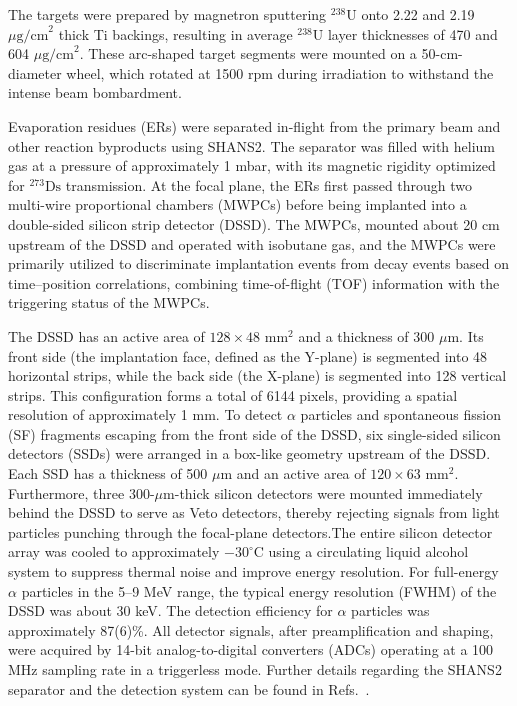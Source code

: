 \documentclass[final,5p,times,twocolumn,number,sort&compress]{elsarticle}
\begin{document}
The targets were prepared by magnetron sputtering $^{238}\text{U}$ onto 2.22 and 2.19 $\mu\text{g/cm}^2$ thick Ti backings, resulting in average $^{238}\text{U}$ layer thicknesses of 470 and 604 $\mu\text{g/cm}^2$. 
These arc-shaped target segments were mounted on a 50-cm-diameter wheel, which rotated at 1500 rpm during irradiation to withstand the intense beam bombardment.

Evaporation residues (ERs) were separated in-flight from the primary beam and other reaction byproducts using SHANS2. 
The separator was filled with helium gas at a pressure of approximately 1 mbar, with its magnetic rigidity optimized for $^{273}\text{Ds}$ transmission.
At the focal plane, the ERs first passed through two multi-wire proportional chambers (MWPCs) before being implanted into a double-sided silicon strip detector (DSSD). 
The MWPCs, mounted about 20 cm upstream of the DSSD and operated with isobutane gas, and the MWPCs were primarily utilized to discriminate implantation events from decay events based on time--position correlations, combining time-of-flight (TOF) information with the triggering status of the MWPCs.

The DSSD has an active area of $128 \times 48\text{ mm}^2$ and a thickness of 300 $\mu\text{m}$. Its front side (the implantation face, defined as the Y-plane) is segmented into 48 horizontal strips, 
while the back side (the X-plane) is segmented into 128 vertical strips. This configuration forms a total of 6144 pixels, providing a spatial resolution of approximately 1 mm. 
To detect $\alpha$ particles and spontaneous fission (SF) fragments escaping from the front side of the DSSD, six single-sided silicon detectors (SSDs) were arranged in a box-like geometry upstream of the DSSD. 
Each SSD has a thickness of 500 $\mu\text{m}$ and an active area of $120 \times 63\text{ mm}^2$. Furthermore, three 300-$\mu\text{m}$-thick silicon detectors were mounted immediately behind the DSSD to serve as Veto detectors,
thereby rejecting signals from light particles punching through the focal-plane detectors.The entire silicon detector array was cooled to approximately $-30^\circ\text{C}$ using a circulating liquid alcohol system to suppress thermal noise and improve energy resolution.
For full-energy $\alpha$ particles in the 5–9 MeV range, the typical energy resolution (FWHM) of the DSSD was about 30 keV. The detection efficiency for $\alpha$ particles was approximately 87(6)\%. 
All detector signals, after preamplification and shaping, were acquired by 14-bit analog-to-digital converters (ADCs) operating at a 100 MHz sampling rate in a triggerless mode. 
Further details regarding the SHANS2 separator and the detection system can be found in Refs.~\cite{xu2023GasfilledRecoilSeparator,sheng2021IonopticalDesignMultiparticle}.
\end{document}
